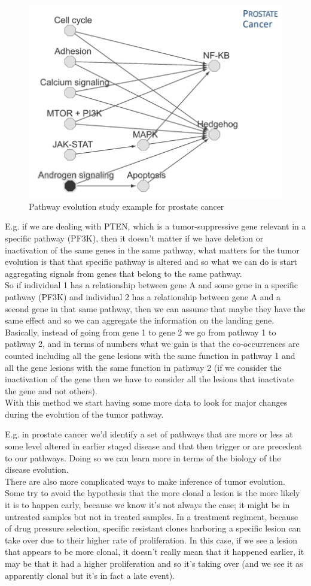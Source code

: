 \begin{figure}[H]
\centering
\includegraphics[width=0.4\linewidth]{pathways.png}
\caption{Pathway evolution study example for prostate cancer}
\label{fig:prostate_path}
\end{figure}

E.g. if we are dealing with PTEN, which is a tumor-suppressive gene relevant in a specific pathway (PF3K), then it doesn't matter if we have deletion or inactivation of the same genes in the same pathway, what matters for the tumor evolution is that that specific pathway is altered and so what we can do is start aggregating signals from genes that belong to the same pathway.
\\
So if individual 1 has a relationship between gene A and some gene in a specific pathway (PF3K) and individual 2 has a relationship between gene A and a second gene in that same pathway, then we can assume that maybe they have the same effect and so we can aggregate the information on the landing gene.
\\
Basically, instead of going from gene 1 to gene 2 we go from pathway 1 to pathway 2, and in terms of numbers what we gain is that the co-occurrences are counted including all the gene lesions with the same function in pathway 1 and all the gene lesions with the same function in pathway 2 (if we consider the inactivation of the gene then we have to consider all the lesions that inactivate the gene and not others).
\\
With this method we start having some more data to look for major changes during the evolution of the tumor pathway.

E.g. in prostate cancer we'd identify a set of pathways that are more or less at some level altered in earlier staged disease and that then trigger or are precedent to our pathways. Doing so we can learn more in terms of the biology of the disease evolution.
\\
There are also more complicated ways to make inference of tumor evolution. Some try to avoid the hypothesis that the more clonal a lesion is the more likely it is to happen early, because we know it's not always the case; it might be in untreated samples but not in treated samples.
In a treatment regiment, because of drug pressure selection, specific resistant clones harboring a specific lesion can take over due to their higher rate of proliferation.
In this case, if we see a lesion that appears to be more clonal, it doesn't really mean that it happened earlier, it may be that it had a higher proliferation and so it's taking over (and we see it as apparently clonal but it's in fact a late event).


